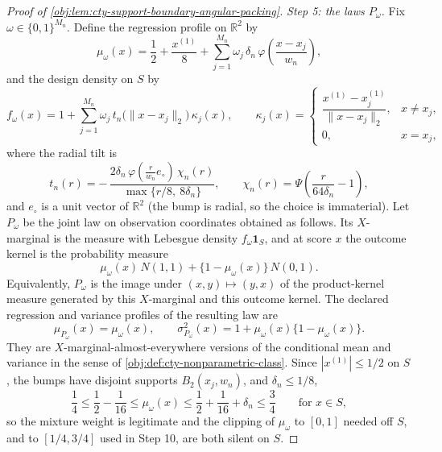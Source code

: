 \documentclass[11pt]{article}
\begin{document}
\begin{proof}[Proof of \cref{obj:lem:cty-support-boundary-angular-packing}]
\emph{Step 5: the laws \(P_\omega\).}  Fix \(\omega\in\{0,1\}^{M_n}\).  Define the regression profile on \(\mathbb R^2\) by
\[
\mu_\omega(x)
=
\frac12+\frac{x^{(1)}}{8}
+
\sum_{j=1}^{M_n}\omega_j\,\delta_n\,
\varphi\!\left(\frac{x-x_j}{w_n}\right),
\]
and the design density on \(S\) by
\[
f_\omega(x)
=
1+\sum_{j=1}^{M_n}\omega_j\,
t_n\bigl(\lVert x-x_j\rVert_2\bigr)\,\kappa_j(x),
\qquad
\kappa_j(x)=
\begin{cases}
\dfrac{x^{(1)}-x_j^{(1)}}{\lVert x-x_j\rVert_2}, & x\ne x_j,\\[2mm]
0,& x=x_j,
\end{cases}
\]
where the radial tilt is
\[
t_n(r)
=
-\,\frac{2\delta_n\,\varphi\!\left(\tfrac{r}{w_n}e_\circ\right)\,\chi_n(r)}
{\max\{r/8,\ 8\delta_n\}},
\qquad
\chi_n(r)=\Psi\!\left(\frac{r}{64\delta_n}-1\right),
\]
and \(e_\circ\) is a unit vector of \(\mathbb R^2\) (the bump is radial, so the choice is immaterial).
Let \(P_\omega\) be the joint law on observation coordinates obtained as follows.  Its \(X\)-marginal is the measure with Lebesgue density \(f_\omega\mathbf 1_S\), and at score \(x\) the outcome kernel is the probability measure
\[
\mu_\omega(x)\,N(1,1)+\{1-\mu_\omega(x)\}\,N(0,1).
\]
Equivalently, \(P_\omega\) is the image under \((x,y)\mapsto(y,x)\) of the product-kernel measure generated by this \(X\)-marginal and this outcome kernel.  The declared regression and variance profiles of the resulting law are
\[
\mu_{P_\omega}(x)=\mu_\omega(x),
\qquad
\sigma^2_{P_\omega}(x)=1+\mu_\omega(x)\{1-\mu_\omega(x)\}.
\]
They are \(X\)-marginal-almost-everywhere versions of the conditional mean and variance in the sense of \cref{obj:def:cty-nonparametric-class}.
Since \(|x^{(1)}|\le1/2\) on \(S\), the bumps have disjoint supports \(B_2(x_j,w_n)\), and \(\delta_n\le1/8\),
\[
\frac14\le\frac12-\frac1{16}\le\mu_\omega(x)\le\frac12+\frac1{16}+\delta_n\le\frac34
\qquad\text{for }x\in S,
\]
so the mixture weight is legitimate and the clipping of \(\mu_\omega\) to \([0,1]\) needed off \(S\), and to \([1/4,3/4]\) used in Step 10, are both silent on \(S\).


\end{proof}
\end{document}
